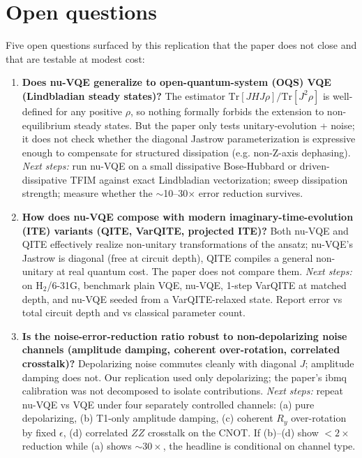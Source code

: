 \section{Open questions}

Five open questions surfaced by this replication that the paper does not
close and that are testable at modest cost:

\begin{enumerate}

\item \textbf{Does nu-VQE generalize to open-quantum-system (OQS) VQE
(Lindbladian steady states)?}
The estimator $\text{Tr}[JHJ\rho]/\text{Tr}[J^2\rho]$ is well-defined for any
positive $\rho$, so nothing formally forbids the extension to
non-equilibrium steady states. But the paper only tests unitary-evolution +
noise; it does not check whether the diagonal Jastrow parameterization is
expressive enough to compensate for structured dissipation (e.g. non-Z-axis
dephasing).
\emph{Next steps:} run nu-VQE on a small dissipative Bose-Hubbard or
driven-dissipative TFIM against exact Lindbladian vectorization; sweep
dissipation strength; measure whether the $\sim$10--30$\times$ error
reduction survives.

\item \textbf{How does nu-VQE compose with modern imaginary-time-evolution
(ITE) variants (QITE, VarQITE, projected ITE)?}
Both nu-VQE and QITE effectively realize non-unitary transformations of the
ansatz; nu-VQE's Jastrow is diagonal (free at circuit depth), QITE
compiles a general non-unitary at real quantum cost. The paper does not
compare them.
\emph{Next steps:} on H$_2$/6-31G, benchmark plain VQE, nu-VQE, 1-step
VarQITE at matched depth, and nu-VQE seeded from a VarQITE-relaxed state.
Report error vs total circuit depth and vs classical parameter count.

\item \textbf{Is the noise-error-reduction ratio robust to non-depolarizing
noise channels (amplitude damping, coherent over-rotation, correlated
crosstalk)?}
Depolarizing noise commutes cleanly with diagonal $J$; amplitude damping
does not. Our replication used only depolarizing; the paper's ibmq
calibration was not decomposed to isolate contributions.
\emph{Next steps:} repeat nu-VQE vs VQE under four separately controlled
channels: (a) pure depolarizing, (b) T1-only amplitude damping,
(c) coherent $R_y$ over-rotation by fixed $\epsilon$, (d) correlated $ZZ$
crosstalk on the CNOT. If (b)--(d) show $<2\times$ reduction while (a)
shows $\sim 30\times$, the headline is conditional on channel type.


\end{enumerate}
